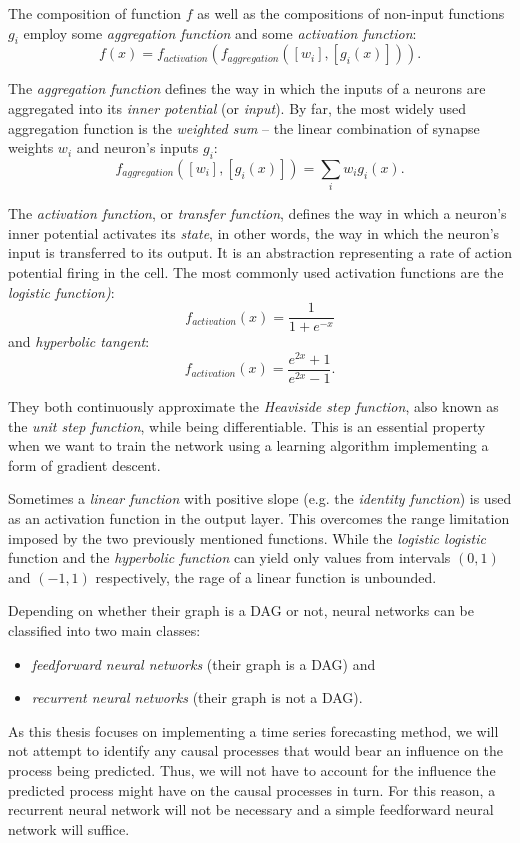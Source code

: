 The composition of function $f$ as well as the compositions of non-input functions $g_i$ employ some \textit{aggregation function} and some \textit{activation function}:
$$ f(x) = f_{activation}(f_{aggregation}([w_i],[g_i(x)])). $$

The \textit{aggregation function} defines the way in which the inputs of a neurons are aggregated into its \textit{inner potential} (or \textit{input}). By far, the most widely used aggregation function is the \textit{weighted sum} -- the linear combination of synapse weights $ w_i $ and neuron's inputs $ g_i $:
$$ f_{aggregation}([w_i],[g_i(x)]) = \sum_{i}{w_i g_i(x)}. $$

The \textit{activation function}, or \textit{transfer function}, defines the way in which a neuron's inner potential activates its \textit{state}, in other words, the way in which the neuron's input is transferred to its output. It is an abstraction representing a rate of action potential firing in the cell. The most commonly used activation functions are the \textit{logistic function)}:
$$ f_{activation}(x) = \frac{1}{1 + e^{-x}} $$
and \textit{hyperbolic tangent}:
$$ f_{activation}(x) = \frac{e^{2x} + 1}{e^{2x} - 1}. $$

They both continuously approximate the \textit{Heaviside step function}, also known as the \textit{unit step function}, while being differentiable. This is an essential property when we want to train the network using a learning algorithm implementing a form of gradient descent.

Sometimes a \textit{linear function} with positive slope (e.g. the \textit{identity function}) is used as an activation function in the output layer. This overcomes the range limitation imposed by the two previously mentioned functions. While the \textit{logistic logistic} function and the \textit{hyperbolic function} can yield only values from intervals $ (0, 1) $ and $ (-1, 1) $ respectively, the rage of a linear function is unbounded.

Depending on whether their graph is a DAG or not, neural networks can be classified into two main classes:
\begin{itemize}
\item \textit{feedforward neural networks} (their graph is a DAG) and
\item \textit{recurrent neural networks} (their graph is not a DAG).
\end{itemize}

As this thesis focuses on implementing a time series forecasting method, we will not attempt to identify any causal processes that would bear an influence on the process being predicted. Thus, we will not have to account for the influence the predicted process might have on the causal processes in turn. For this reason, a recurrent neural network will not be necessary and a simple feedforward neural network will suffice.

